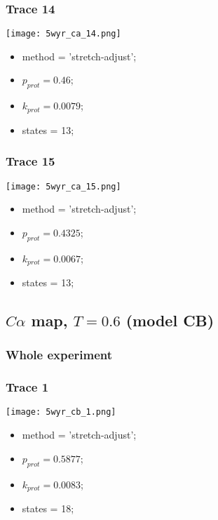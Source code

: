 \subsubsection{Trace 14}
\begin{minipage}[c]{0.7\textwidth}
    \texttt{[image: 5wyr\_ca\_14.png]}
\end{minipage}
\hfill
\begin{minipage}[c]{0.45\textwidth}
    \begin{itemize}
        \item method = 'stretch-adjust';
        \item $p_{prot}=0.46$;
        \item $k_{prot}=0.0079$;
        \item states = 13;
    \end{itemize}
\end{minipage}

\subsubsection{Trace 15}
\begin{minipage}[c]{0.7\textwidth}
    \texttt{[image: 5wyr\_ca\_15.png]}
\end{minipage}
\hfill
\begin{minipage}[c]{0.45\textwidth}
    \begin{itemize}
        \item method = 'stretch-adjust';
        \item $p_{prot}=0.4325$;
        \item $k_{prot}=0.0067$;
        \item states = 13;
    \end{itemize}
\end{minipage}

\subsection{$C\alpha$ map, $T=0.6$ (model CB)}
\subsubsection{Whole experiment}

\subsubsection{Trace 1}
\begin{minipage}[c]{0.7\textwidth}
    \texttt{[image: 5wyr\_cb\_1.png]}
\end{minipage}
\hfill
\begin{minipage}[c]{0.45\textwidth}
    \begin{itemize}
        \item method = 'stretch-adjust';
        \item $p_{prot}=0.5877$;
        \item $k_{prot}=0.0083$;
        \item states = 18;
    \end{itemize}
\end{minipage}

